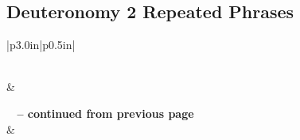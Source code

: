 \subsection{Deuteronomy 2 Repeated Phrases}


\normalsize
 
\begin{center}
\begin{longtable}{|p{3.0in}|p{0.5in}|}
\caption[Deuteronomy 2 Repeated Phrases]{Deuteronomy 2 Repeated Phrases}\label{table:Repeated Phrases Deuteronomy 2} \\
\hline {} &  \\ \hline 
\endfirsthead
 
{{\bfseries \tablename\ \thetable{} -- continued from previous page}} \\  
\hline {} &  \\ \hline 
\endhead
 

\end{longtable}
\end{center}
